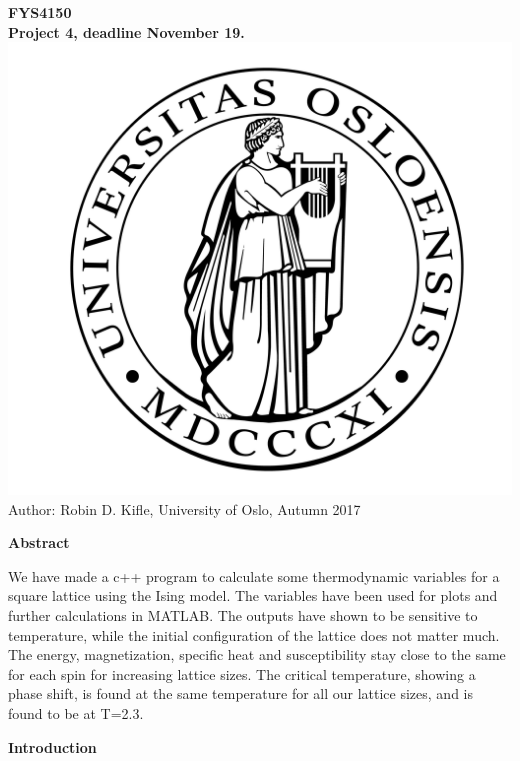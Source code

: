 \documentclass[10pt,a4paper]{article}
\begin{document}
\begin{center}
{\LARGE\bf
FYS4150\\
Project 4, deadline November 19.
}
 \includegraphics[scale=0.075]{uio.png}\\
Author: Robin D. Kifle,
University of Oslo, Autumn 2017

\vspace{3cm}
{\LARGE\bf
Abstract
}
\end{center}
We have made a c++ program to calculate some thermodynamic variables for a square lattice using the Ising model. The variables have been used for plots and further calculations in MATLAB. The outputs have shown to be sensitive to temperature, while the initial configuration of the lattice does not matter much. The energy, magnetization, specific heat and susceptibility stay close to the same for each spin for increasing lattice sizes. The critical temperature, showing a phase shift, is found at the same temperature for all our lattice sizes, and is found to be at T=2.3.

\newpage

{\LARGE\bf
Introduction
}\\
\end{document}
